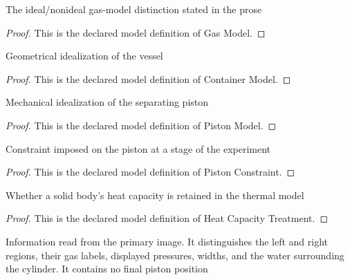 \begin{definition}
  \label{def:physics:phyx-mini-0359:phyxminiproblems-problemphyxmini0359-gasmodel}
  The ideal/nonideal gas-model distinction stated in the prose
\end{definition}
\begin{proof}
  This is the declared model definition of Gas Model.
\end{proof}
\begin{definition}
  \label{def:physics:phyx-mini-0359:phyxminiproblems-problemphyxmini0359-containermodel}
  Geometrical idealization of the vessel
\end{definition}
\begin{proof}
  This is the declared model definition of Container Model.
\end{proof}
\begin{definition}
  \label{def:physics:phyx-mini-0359:phyxminiproblems-problemphyxmini0359-pistonmodel}
  Mechanical idealization of the separating piston
\end{definition}
\begin{proof}
  This is the declared model definition of Piston Model.
\end{proof}
\begin{definition}
  \label{def:physics:phyx-mini-0359:phyxminiproblems-problemphyxmini0359-pistonconstraint}
  Constraint imposed on the piston at a stage of the experiment
\end{definition}
\begin{proof}
  This is the declared model definition of Piston Constraint.
\end{proof}
\begin{definition}
  \label{def:physics:phyx-mini-0359:phyxminiproblems-problemphyxmini0359-heatcapacitytreatment}
  Whether a solid body's heat capacity is retained in the thermal model
\end{definition}
\begin{proof}
  This is the declared model definition of Heat Capacity Treatment.
\end{proof}
\begin{definition}
  \label{def:physics:phyx-mini-0359:phyxminiproblems-problemphyxmini0359-pistoncylinderfigure}
  Information read from the primary image. It distinguishes the left and right regions, their gas labels, displayed pressures, widths, and the water surrounding the cylinder. It contains no final piston position
\end{definition}
